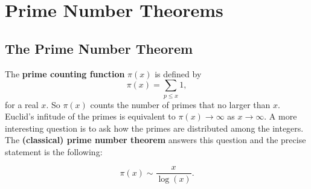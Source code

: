   \section{Prime Number Theorems}
    \subsection*{The Prime Number Theorem}
      The \textbf{prime counting function} $\pi(x)$ is defined by
      \[
        \pi(x) = \sum_{p \le x}1,
      \]
      for a real $x$. So $\pi(x)$ counts the number of primes that no larger than $x$. Euclid's infitude of the primes is equivalent to $\pi(x) \to \infty$ as $x \to \infty$. A more interesting question is to ask how the primes are distributed among the integers. The \textbf{(classical) prime number theorem} answers this question and the precise statement is the following:

      \begin{theorem}
        \phantom{ }
        \[
          \pi(x) \sim \frac{x}{\log(x)}.
        \]
      \end{theorem}

